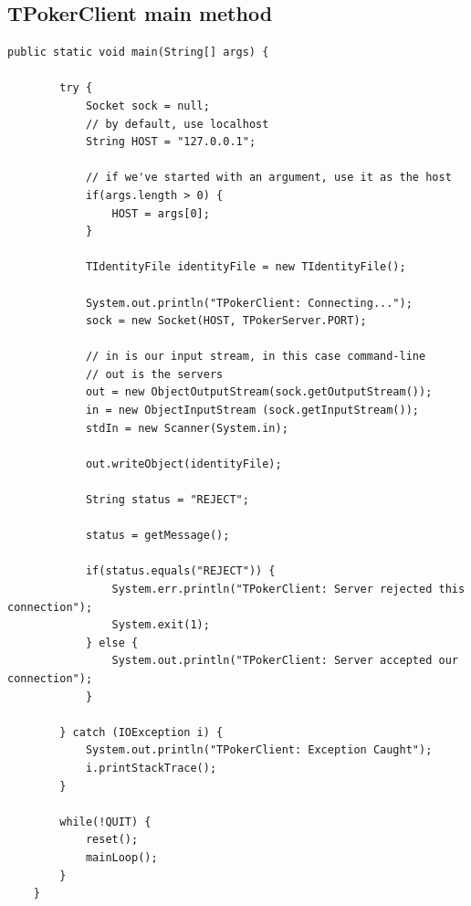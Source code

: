 \documentclass[11pt]{article}
\begin{document}
\subsection{TPokerClient main method}
\begin{lstlisting}[breaklines=true]
    public static void main(String[] args) {

        try {
            Socket sock = null;
            // by default, use localhost
            String HOST = "127.0.0.1";
            
            // if we've started with an argument, use it as the host
            if(args.length > 0) {
                HOST = args[0];
            }

            TIdentityFile identityFile = new TIdentityFile();

            System.out.println("TPokerClient: Connecting...");
            sock = new Socket(HOST, TPokerServer.PORT);

            // in is our input stream, in this case command-line
            // out is the servers
            out = new ObjectOutputStream(sock.getOutputStream());
            in = new ObjectInputStream (sock.getInputStream());
            stdIn = new Scanner(System.in);

            out.writeObject(identityFile);

            String status = "REJECT";

            status = getMessage();

            if(status.equals("REJECT")) {
                System.err.println("TPokerClient: Server rejected this connection");
                System.exit(1);
            } else {
                System.out.println("TPokerClient: Server accepted our connection");
            }

        } catch (IOException i) {
            System.out.println("TPokerClient: Exception Caught");
            i.printStackTrace();
        }

        while(!QUIT) {
            reset();
            mainLoop();
        }
    }
\end{lstlisting}
\end{document}
